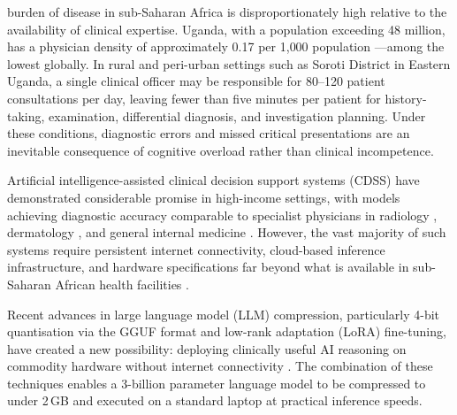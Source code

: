 \documentclass[conference]{IEEEtran}
\begin{document}
 burden of disease in sub-Saharan Africa is
disproportionately high relative to the availability of clinical
expertise. Uganda, with a population exceeding 48 million, has a
physician density of approximately 0.17 per 1{,}000 population
\cite{who2023workforce}---among the lowest globally. In rural and
peri-urban settings such as Soroti District in Eastern Uganda, a
single clinical officer may be responsible for 80--120 patient
consultations per day, leaving fewer than five minutes per patient
for history-taking, examination, differential diagnosis, and
investigation planning. Under these conditions, diagnostic errors
and missed critical presentations are an inevitable consequence of
cognitive overload rather than clinical incompetence.

Artificial intelligence-assisted clinical decision support systems
(CDSS) have demonstrated considerable promise in high-income
settings, with models achieving diagnostic accuracy comparable to
specialist physicians in radiology \cite{rajpurkar2022ai},
dermatology \cite{esteva2017dermatologist}, and general internal
medicine \cite{mcdermott2021comprehensive}. However, the vast
majority of such systems require persistent internet connectivity,
cloud-based inference infrastructure, and hardware specifications
far beyond what is available in sub-Saharan African health
facilities \cite{nkosi2023challenges}.

Recent advances in large language model (LLM) compression,
particularly 4-bit quantisation via the GGUF format and low-rank
adaptation (LoRA) fine-tuning, have created a new possibility:
deploying clinically useful AI reasoning on commodity hardware
without internet connectivity \cite{dettmers2023qlora,gerganov2023llamacpp}.
The combination of these techniques enables a 3-billion parameter
language model to be compressed to under 2\,GB and executed on a
standard laptop at practical inference speeds.
\end{document}
